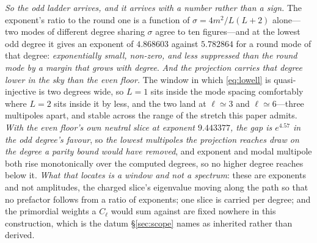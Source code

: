 \documentclass[11pt,a4paper]{article}
\theoremstyle{plain}
\theoremstyle{definition}
\theoremstyle{remark}
\begin{document}
\emph{So the odd ladder arrives, and it arrives with a number rather than a sign.} The exponent's ratio to the round one is a function of $\sigma=4m^2/L(L+2)$ alone---two modes of different degree sharing $\sigma$ agree to ten figures---and at the lowest odd degree it gives an exponent of $4.868603$ against $5.782864$ for a round mode of that degree: \emph{exponentially small, non-zero, and less suppressed than the round mode by a margin that grows with degree}. \emph{And the projection carries that degree lower in the sky than the even floor.} The window in which \eqref{eq:lowell} is quasi-injective is two degrees wide, so $L=1$ sits inside the mode spacing comfortably where $L=2$ sits inside it by less, and the two land at $\ell\simeq3$ and $\ell\simeq6$---three multipoles apart, and stable across the range of the stretch this paper admits. \emph{With the even floor's own neutral slice at exponent $9.443377$, the gap is $e^{4.57}$ in the odd degree's favour}, so \emph{the lowest multipoles the projection reaches draw on the degree a parity bound would have removed}, and exponent and modal multipole both rise monotonically over the computed degrees, so no higher degree reaches below it. \emph{What that locates is a window and not a spectrum}: these are exponents and not amplitudes, the charged slice's eigenvalue moving along the path so that no prefactor follows from a ratio of exponents; one slice is carried per degree; and the primordial weights a $C_\ell$ would sum against are fixed nowhere in this construction, which is the datum \S\ref{sec:scope} names as inherited rather than derived.
\end{document}
